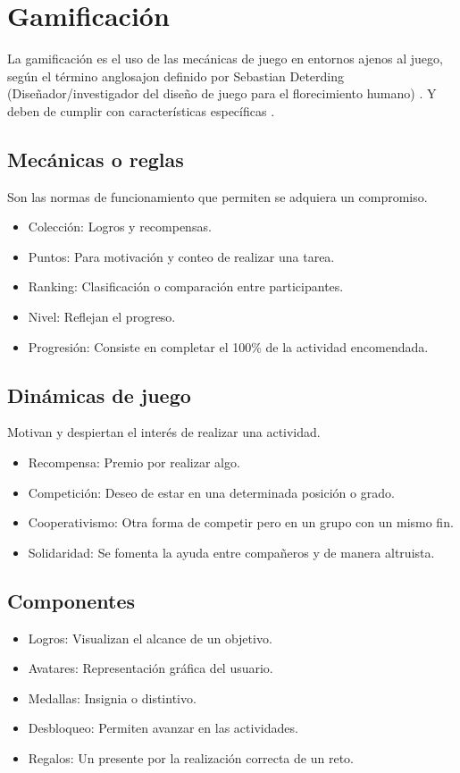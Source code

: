 \section{Gamificación}
La gamificación es el uso de las mecánicas de juego en entornos ajenos al juego, según el término anglosajon definido por Sebastian Deterding (Diseñador/investigador del diseño de juego para el florecimiento humano) \cite{gameDef}. Y deben de cumplir con características específicas \cite{gameficacion}.
\\[1pt]

\subsection{Mecánicas o reglas}
Son las normas de funcionamiento que permiten se adquiera un compromiso.
\\[1pt]

\begin{itemize}
	\item Colección: Logros y recompensas.
	\item Puntos: Para motivación y conteo de realizar una tarea.
	\item Ranking: Clasificación o comparación entre participantes.
	\item Nivel: Reflejan el progreso.
	\item Progresión: Consiste en completar el 100\% de la actividad encomendada.	
\end{itemize}

\subsection{Dinámicas de juego}
Motivan y despiertan el interés de realizar una actividad.
\\[1pt]

\begin{itemize}
	\item Recompensa: Premio por realizar algo.
	\item Competición: Deseo de estar en una determinada posición o grado.
	\item Cooperativismo: Otra forma de competir pero en un grupo con un mismo fin.
	\item Solidaridad: Se fomenta la ayuda entre compañeros y de manera altruista.
\end{itemize}

\subsection{Componentes}
\begin{itemize}
	\item Logros: Visualizan el alcance de un objetivo.
	\item Avatares: Representación gráfica del usuario.
	\item Medallas: Insignia o distintivo.
	\item Desbloqueo: Permiten avanzar en las actividades.
	\item Regalos: Un presente por la realización correcta de un reto.
\end{itemize}


